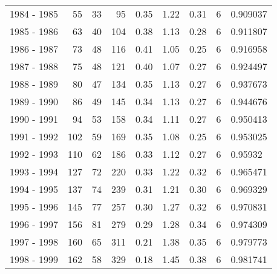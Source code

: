 \begin{tabular}{lrrrrrrrl}
1984 - 1985 &                      55 &          33 &       95 &        0.35 &        1.22 &        0.31 &           6 &   0.909037 \\
1985 - 1986 &                      63 &          40 &      104 &        0.38 &        1.13 &        0.28 &           6 &   0.911807 \\
1986 - 1987 &                      73 &          48 &      116 &        0.41 &        1.05 &        0.25 &           6 &   0.916958 \\
1987 - 1988 &                      75 &          48 &      121 &        0.40 &        1.07 &        0.27 &           6 &   0.924497 \\
1988 - 1989 &                      80 &          47 &      134 &        0.35 &        1.13 &        0.27 &           6 &   0.937673 \\
1989 - 1990 &                      86 &          49 &      145 &        0.34 &        1.13 &        0.27 &           6 &   0.944676 \\
1990 - 1991 &                      94 &          53 &      158 &        0.34 &        1.11 &        0.27 &           6 &   0.950413 \\
1991 - 1992 &                     102 &          59 &      169 &        0.35 &        1.08 &        0.25 &           6 &   0.953025 \\
1992 - 1993 &                     110 &          62 &      186 &        0.33 &        1.12 &        0.27 &           6 &    0.95932 \\
1993 - 1994 &                     127 &          72 &      220 &        0.33 &        1.22 &        0.32 &           6 &   0.965471 \\
1994 - 1995 &                     137 &          74 &      239 &        0.31 &        1.21 &        0.30 &           6 &   0.969329 \\
1995 - 1996 &                     145 &          77 &      257 &        0.30 &        1.27 &        0.32 &           6 &   0.970831 \\
1996 - 1997 &                     156 &          81 &      279 &        0.29 &        1.28 &        0.34 &           6 &   0.974309 \\
1997 - 1998 &                     160 &          65 &      311 &        0.21 &        1.38 &        0.35 &           6 &   0.979773 \\
1998 - 1999 &                     162 &          58 &      329 &        0.18 &        1.45 &        0.38 &           6 &   0.981741 \\

\end{tabular}
